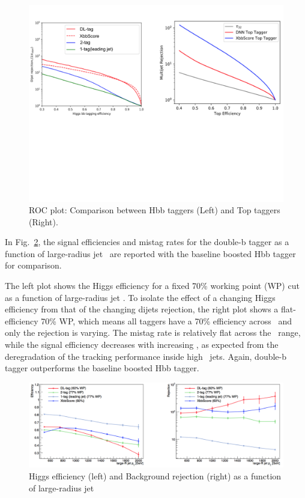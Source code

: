 \begin{figure}[htbp!]
    \centering
    \includegraphics[clip, trim=0 9cm 0 0, width=1\textwidth]{chapters/c10/figures/roc}
    \caption{ROC plot: Comparison between Hbb taggers (Left) and Top taggers (Right).}
    \label{fig:xbb_roc}
\end{figure}

\par In Fig.~\ref{fig:xbb_pt}, the signal efficiencies and mistag rates for the double-b tagger as a function of large-radius jet \pt~are reported with the baseline boosted Hbb tagger for comparison.

\par The left plot shows the Higgs efficiency for a fixed 70\% working point (WP) cut as a function of large-radius jet \pt. To isolate the effect of a changing Higgs efficiency from that of the changing dijets rejection, the right plot shows a flat-efficiency 70\% WP, which means all taggers have a 70\% efficiency across \pt~and only the rejection is varying. The mistag rate is relatively flat across the \pt~range, while the signal efficiency decreases with increasing \pt, as expected from the deregradation of the tracking performance inside high \pt~jets. 
Again, double-b tagger outperforms the baseline boosted Hbb tagger.

\begin{figure}[htbp!]
    \centering
    \includegraphics[clip, trim=0 0 0 0, width=1\textwidth]{chapters/c10/figures/pt}
    \caption{Higgs efficiency (left) and Background rejection (right) as a function of large-radius jet \pt}
    \label{fig:xbb_pt}
\end{figure}